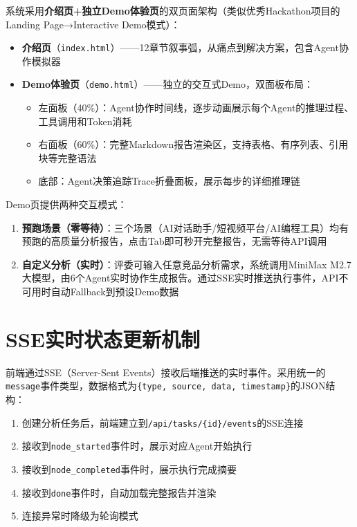 \documentclass[12pt,a4paper]{ctexrep}
\begin{document}
系统采用\textbf{介绍页+独立Demo体验页}的双页面架构（类似优秀Hackathon项目的Landing Page→Interactive Demo模式）：

\begin{itemize}
\item \textbf{介绍页}（\texttt{index.html}）——12章节叙事弧，从痛点到解决方案，包含Agent协作模拟器
\item \textbf{Demo体验页}（\texttt{demo.html}）——独立的交互式Demo，双面板布局：
  \begin{itemize}
  \item 左面板（40\%）：Agent协作时间线，逐步动画展示每个Agent的推理过程、工具调用和Token消耗
  \item 右面板（60\%）：完整Markdown报告渲染区，支持表格、有序列表、引用块等完整语法
  \item 底部：Agent决策追踪Trace折叠面板，展示每步的详细推理链
  \end{itemize}
\end{itemize}

Demo页提供两种交互模式：

\begin{enumerate}
\item \textbf{预跑场景（零等待）}：三个场景（AI对话助手/短视频平台/AI编程工具）均有预跑的高质量分析报告，点击Tab即可秒开完整报告，无需等待API调用
\item \textbf{自定义分析（实时）}：评委可输入任意竞品分析需求，系统调用MiniMax M2.7大模型，由6个Agent实时协作生成报告。通过SSE实时推送执行事件，API不可用时自动Fallback到预设Demo数据
\end{enumerate}

\section{SSE实时状态更新机制}

前端通过SSE（Server-Sent Events）接收后端推送的实时事件。采用统一的\texttt{message}事件类型，数据格式为\texttt{\{type, source, data, timestamp\}}的JSON结构：

\begin{enumerate}
\item 创建分析任务后，前端建立到\texttt{/api/tasks/\{id\}/events}的SSE连接
\item 接收到\texttt{node\_started}事件时，展示对应Agent开始执行
\item 接收到\texttt{node\_completed}事件时，展示执行完成摘要
\item 接收到\texttt{done}事件时，自动加载完整报告并渲染
\item 连接异常时降级为轮询模式
\end{enumerate}
\end{document}
